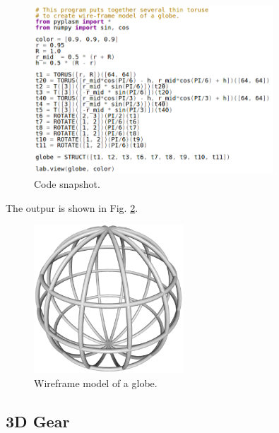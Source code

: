 \documentclass{article}
\begin{document}
\newpage
\begin{figure}[!ht]
\begin{center}
\includegraphics[width=0.8\textwidth]{img/globe-code.png}
\end{center}
\vspace{-2mm}
\caption{Code snapshot.}
\label{fig:globe-code}
\end{figure}
\noindent
The outpur is shown in Fig. \ref{fig:globe}.
\begin{figure}[!ht]
\begin{center}
\includegraphics[width=0.5\textwidth]{img/globe.png}
\end{center}
\vspace{-2mm}
\caption{Wireframe model of a globe.}
\label{fig:globe}
\vspace{-1cm}
\end{figure}

\newpage

\subsection{3D Gear}
\end{document}
